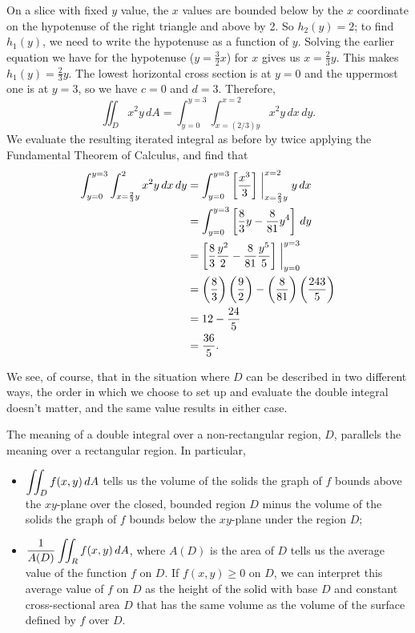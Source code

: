 \begin{example}
\begin{description}
On a slice with fixed $y$ value, the $x$ values are bounded below by the $x$ coordinate on the hypotenuse of the right triangle and above by 2. So $h_2(y) = 2$; to find $h_1(y)$, we need to write the hypotenuse as a function of $y$. Solving the earlier equation we have for the hypotenuse ($y = \frac32 x$) for $x$ gives us $x = \frac{2}{3}y$. This makes $h_1(y) = \frac{2}{3}y$. The lowest horizontal cross section is at $y=0$ and the uppermost one is at $y=3$, so we have $c=0$ and $d=3$. Therefore,
\[\iint_D x^2y \, dA = \int_{y=0}^{y=3} \int_{x=(2/3)y}^{x=2} x^2y \, dx \, dy.\]
We evaluate the resulting iterated integral as before by twice applying the Fundamental Theorem of Calculus, and find that
\begin{align*}
\int_{y=0}^{y=3} \int_{x=\frac{2}{3}y}^{2} x^2y \, dx \, dy &= \int_{y=0}^{y=3} \left[\frac{x^3}{3}\right]\biggm|_{x=\frac{2}{3}y}^{x=2}y \, dx \\
	&= \int_{y=0}^{y=3} \left[\frac{8}{3}y - \frac{8}{81}y^4 \right] \, dy \\
	&= \left[\frac{8}{3}\frac{y^2}{2} - \frac{8}{81}\frac{y^5}{5}\right]\biggm|_{y=0}^{y=3} \\
	&= \left(\frac{8}{3}\right) \left(\frac{9}{2}\right) - \left(\frac{8}{81}\right) \left(\frac{243}{5}\right) \\
	&= 12 - \frac{24}{5} \\
	&= \frac{36}{5}.
\end{align*}
\end{description}
We see, of course, that in the situation where $D$ can be described in two different ways, the order in which we choose to set up and evaluate the double integral doesn't matter, and the same value results in either case.

\end{example}

The meaning of a double integral over a non-rectangular region, $D$, parallels the meaning over a rectangular region.  In particular,
\begin{itemize}
\item $\displaystyle \iint_D f(x,y) \, dA$ tells us the volume of the solids the graph of $f$ bounds above the $xy$-plane over the closed, bounded region $D$ minus the volume of the solids the graph of $f$ bounds below the $xy$-plane under the region $D$;
\item $\displaystyle \frac{1}{A(D)} \iint_R f(x,y) \, dA$, where $A(D)$ is the area of $D$ tells us the average value of the function $f$ on $D$. If $f(x, y) \geq  0$ on $D$, we can interpret this average value of $f$ on $D$ as the height of the solid with base $D$ and constant cross-sectional area $D$ that has the same volume as the volume of the surface defined by $f$ over $D$.
\end{itemize}

